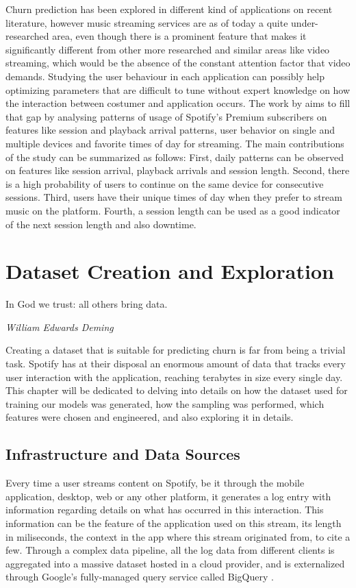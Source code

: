 \documentclass{kththesis}
\begin{document}
Churn prediction has been explored in different kind of applications on recent literature, however music streaming services are as of today a quite under-researched area, even though there is a prominent feature that makes it significantly different from other more researched and similar areas like video streaming, which would be the absence of the constant attention factor that video demands. Studying the user behaviour in each application can possibly help optimizing parameters that are difficult to tune without expert knowledge on how the interaction between costumer and application occurs. The work by \citep{Zhang2013} aims to fill that gap by analysing patterns of usage of Spotify's Premium subscribers on features like session and playback arrival patterns, user behavior on single and multiple devices and favorite times of day for streaming. The main contributions of the study can be summarized as follows: First, daily patterns can be observed on features like session arrival, playback arrivals and session length. Second, there is a high probability of users to continue on the same device for consecutive sessions. Third, users have their unique times of day when they prefer to stream music on the platform. Fourth, a session length can be used as a good indicator of the next session length and also downtime.

\chapter{Dataset Creation and Exploration}
\label{chap:dataset}

\epigraph{In God we trust: all others bring data.}{\textit{William Edwards Deming}}

Creating a dataset that is suitable for predicting churn is far from being a trivial task. Spotify has at their disposal an enormous amount of data that tracks every user interaction with the application, reaching terabytes in size every single day. This chapter will be dedicated to delving into details on how the dataset used for training our models was generated, how the sampling was performed, which features were chosen and engineered, and also exploring it in details.

\section{Infrastructure and Data Sources}

Every time a user streams content on Spotify, be it through the mobile application, desktop, web or any other platform, it generates a log entry with information regarding details on what has occurred in this interaction. This information can be the feature of the application used on this stream, its length in miliseconds, the context in the app where this stream originated from, to cite a few. Through a complex data pipeline, all the log data from different clients is aggregated into a massive dataset hosted in a cloud provider, and is externalized through Google's fully-managed query service called BigQuery \citep{sato2012inside}. 
\end{document}
